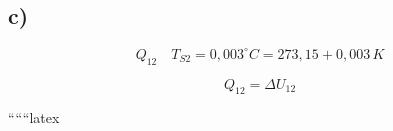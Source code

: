

\subsection*{c)}
\begin{equation*}
Q_{12} \quad T_{S2} = 0{,}003^\circ C = 273{,}15 + 0{,}003 \, K
\end{equation*}

\begin{equation*}
Q_{12} = \Delta U_{12}
\end{equation*}

``````latex